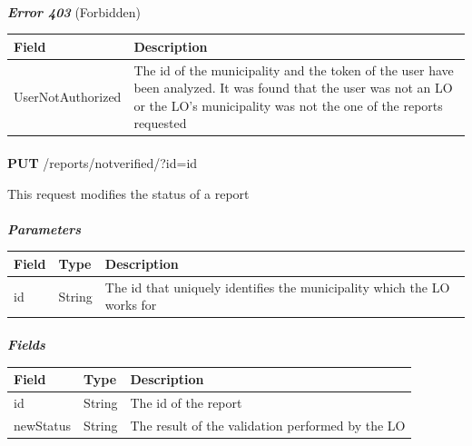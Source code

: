						\paragraph{}
							\textit{\textbf{Error 403}} (Forbidden)
							\vspace{-2mm}
							\begin{table}[!h]
								\begin{tabular}{L{0.4\textwidth}L{0.4\textwidth}}
									\toprule
									\textbf{Field} & \textbf{Description} \\
									\midrule
								  	UserNotAuthorized & The id of the municipality and the token of the user have been analyzed. It was found that the user was not an LO or the LO's municipality was not the one of the reports requested \\
								 	\bottomrule
								\end{tabular}
							\end{table}
							
							\paragraph{}
						\textbf{PUT} /reports/notverified/?id={id}
						
						This request modifies the status of a report
						\paragraph{}
							\textit{\textbf{Parameters}}
							\vspace{-2mm}
							\begin{table}[!h]
								\begin{tabular}{L{0.2\textwidth}L{0.2\textwidth}L{0.4\textwidth}}
									\toprule
									\textbf{Field} & \textbf{Type} & \textbf{Description} \\
									\midrule
								 	id & String & The id that uniquely identifies the municipality which the LO works for \\
								 	\bottomrule
								\end{tabular}
							\end{table}
						\vspace{-5mm}
						\paragraph{}
							\textit{\textbf{Fields}}
							\vspace{-2mm}
							\begin{table}[!h]
								\begin{tabular}{L{0.2\textwidth}L{0.15\textwidth}L{0.4\textwidth}}
									\toprule
									\textbf{Field} & \textbf{Type} & \textbf{Description} \\
									\midrule
								 	id & String & The id of the report \\
								 	newStatus & String & The result of the validation performed by the LO \\
								 	\bottomrule
								\end{tabular}
							\end{table}
